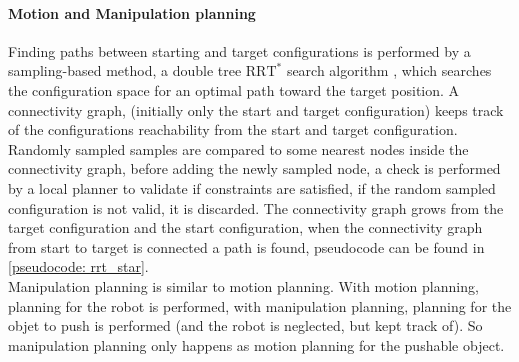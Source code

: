\paragraph{Motion and Manipulation planning}
Finding paths between starting and target configurations is performed by a sampling-based method, a double tree $\text{RRT}^*$ search algorithm \cite{chen_fast_2018}, which searches the configuration space for an optimal path toward the target position. A connectivity graph, (initially only the start and target configuration) keeps track of the configurations reachability from the start and target configuration. Randomly sampled samples are compared to some nearest nodes inside the connectivity graph, before adding the newly sampled node, a check is performed by a local planner to validate if constraints are satisfied, if the random sampled configuration is not valid, it is discarded. The connectivity graph grows from the target configuration and the start configuration, when the connectivity graph from start to target is connected a path is found, pseudocode can be found in \cref{pseudocode: rrt_star}.\\

Manipulation planning is similar to motion planning. With motion planning, planning for the robot is performed, with manipulation planning, planning for the objet to push is performed (and the robot is neglected, but kept track of). So manipulation planning only happens as motion planning for the pushable object.\\

